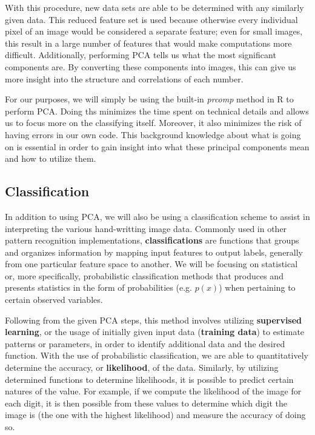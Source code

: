 \documentclass[twocolumn]{article}
\begin{document}
With this procedure, new data sets are able to be determined with any similarly given data. This reduced feature set is used because otherwise every individual pixel of an image would be considered a separate feature; even for small images, this result in a large number of features that would make computations more difficult. Additionally, performing PCA tells us what the most significant components are. By converting these components into images, this can give us more insight into the structure and correlations of each number.

For our purposes, we will simply be using the built-in \emph{prcomp} method in R to perform PCA. Doing ths minimizes the time spent on technical details and allows us to focus more on the classifying itself. Moreover, it also minimizes the risk of having errors in our own code. This background knowledge about what is going on is essential in order to gain insight into what these principal components mean and how to utilize them.

\subsection{Classification} %
\label{subsec:classification}
In addition to using PCA, we will also be using a classification scheme to assist in interpreting the various hand-writting image data. Commonly used in other pattern recognition implementations, \textbf{classifications} are functions that groups and organizes information by mapping input features to output labels, generally from one particular feature space to another. We will be focusing on statistical or, more specifically, probabilistic classification methods that produces and presents statistics in the form of probabilities (e.g. $p(x)$) when pertaining to certain observed variables. 

Following from the given PCA steps, this method involves utilizing \textbf{supervised learning}, or the usage of initially given input data (\textbf{training data}) to estimate patterns or parameters, in order to identify additional data and the desired function. With the use of probabilistic classification, we are able to quantitatively determine the accuracy, or \textbf{likelihood}, of the data. Similarly, by utilizing determined functions to determine likelihoods, it is possible to predict certain natures of the value. For example, if we compute the likelihood of the image for each digit, it is then possible from these values to determine which digit the image is (the one with the highest likelihood) and measure the accuracy of doing so.
\end{document}
